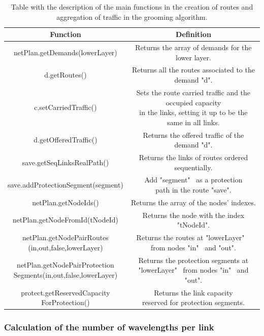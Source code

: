 \begin{table}[H]
\centering
\begin{tabular}{|| c | c ||}
 \hline
 Function & Definition \\
 \hline\hline
 netPlan.getDemands(lowerLayer) & Returns the array of demands for the lower layer. \\
 \hline
 d.getRoutes() & Returns all the routes associated to the demand "d". \\
 \hline
 c.setCarriedTraffic() & \makecell{Sets the route carried traffic and the occupied capacity\\in the links, setting it up to be the same in all links.} \\
 \hline
 d.getOfferedTraffic() & Returns the offered traffic of the demand "d". \\
 \hline
 save.getSeqLinksRealPath() & Returns the links of routes ordered sequentially. \\
 \hline
 save.addProtectionSegment(segment) & \makecell{Add "segment" \ as a protection\\path in the route "save".} \\
 \hline
 netPlan.getNodeIds() & Returns the array of the nodes' indexes. \\
 \hline
 netPlan.getNodeFromId(tNodeId) & Returns the node with the index "tNodeId". \\
 \hline
 \makecell{netPlan.getNodePairRoutes\\(in,out,false,lowerLayer)} & \makecell{Returns the routes at "lowerLayer" \ \\from nodes "in" \ and "out".} \\
 \hline
 \makecell{netPlan.getNodePairProtection\\Segments(in,out,false,lowerLayer)} & \makecell{Returns the protection segments at\\"lowerLayer" \ from nodes "in" \ and "out".} \\
 \hline
 \makecell{protect.getReservedCapacity\\ForProtection()} & \makecell{Returns the link capacity\\reserved for protection segments.} \\
 \hline
\end{tabular}
\caption{Table with the description of the main functions in the creation of routes and aggregation of traffic in the grooming algorithm.}
\label{grooming_table_variables_transparent_protec}
\end{table}

\subsubsection{Calculation of the number of wavelengths per link}


